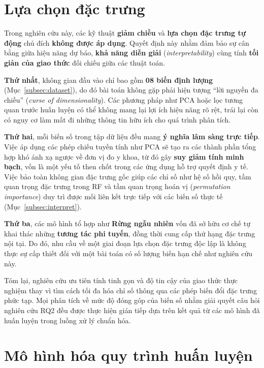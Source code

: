 \documentclass[14pt,a4paper]{extreport}
\begin{document}
\section{Lựa chọn đặc trưng}
\label{subsec:features}

Trong nghiên cứu này, các kỹ thuật \textbf{giảm chiều} và \textbf{lựa chọn đặc trưng tự động} chủ đích \textbf{không được áp dụng}. Quyết định này nhằm đảm bảo sự cân bằng giữa hiệu năng dự báo, \textbf{khả năng diễn giải} (\textit{interpretability}) cùng tính \textbf{tối giản của giao thức} đối chiếu giữa các thuật toán.

\textbf{Thứ nhất}, không gian đầu vào chỉ bao gồm \textbf{08 biến định lượng} (Mục~\ref{subsec:dataset}), do đó bài toán không gặp phải hiện tượng ``lời nguyền đa chiều'' (\textit{curse of dimensionality}). Các phương pháp như PCA hoặc lọc tương quan trước huấn luyện có thể không mang lại lợi ích hiệu năng rõ rệt, trái lại còn có nguy cơ làm mất đi những thông tin hữu ích cho quá trình phân tích.

\textbf{Thứ hai}, mỗi biến số trong tập dữ liệu đều mang \textbf{ý nghĩa lâm sàng trực tiếp}. Việc áp dụng các phép chiếu tuyến tính như PCA sẽ tạo ra các thành phần tổng hợp khó ánh xạ ngược về đơn vị đo y khoa, từ đó gây \textbf{suy giảm tính minh bạch}, vốn là một yếu tố then chốt trong các ứng dụng hỗ trợ quyết định y tế. Việc bảo toàn không gian đặc trưng gốc giúp các chỉ số như hệ số hồi quy, tầm quan trọng đặc trưng trong RF và tầm quan trọng hoán vị (\textit{permutation importance}) duy trì được mối liên kết trực tiếp với các biến số thực tế (Mục~\ref{subsec:interpret}).

\textbf{Thứ ba}, các mô hình tổ hợp như \textbf{Rừng ngẫu nhiên} vốn đã sở hữu cơ chế tự khai thác những \textbf{tương tác phi tuyến}, đồng thời cung cấp thứ hạng đặc trưng nội tại. Do đó, nhu cầu về một giai đoạn lựa chọn đặc trưng độc lập là không thực sự cấp thiết đối với một bài toán có số lượng biến hạn chế như nghiên cứu này.

Tóm lại, nghiên cứu ưu tiên tính tinh gọn và độ tin cậy của giao thức thực nghiệm thay vì tìm cách tối đa hóa chỉ số thông qua các phép biến đổi đặc trưng phức tạp. Mọi phân tích về mức độ đóng góp của biến số nhằm giải quyết câu hỏi nghiên cứu RQ2 đều được thực hiện gián tiếp dựa trên kết quả từ các mô hình đã huấn luyện trong luồng xử lý chuẩn hóa.\cite{pedregosa2011}

\section{Mô hình hóa quy trình huấn luyện}
\label{subsec:models}
\label{subsec:training}
\end{document}
